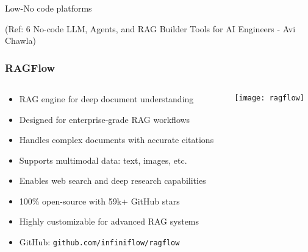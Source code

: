 \begin{frame}[fragile]\frametitle{}
\begin{center}
{\Large Low-No code platforms}

{\tiny (Ref: 6 No-code LLM, Agents, and RAG Builder Tools for AI Engineers - Avi Chawla)}
\end{center}
\end{frame}

\begin{frame}[fragile]\frametitle{RAGFlow}
\begin{columns}
    \begin{column}[T]{0.6\linewidth}
      \begin{itemize}
        \item RAG engine for deep document understanding
        \item Designed for enterprise-grade RAG workflows
        \item Handles complex documents with accurate citations
        \item Supports multimodal data: text, images, etc.
        \item Enables web search and deep research capabilities
        \item 100\% open-source with 59k+ GitHub stars
        \item Highly customizable for advanced RAG systems
        \item GitHub: \texttt{github.com/infiniflow/ragflow}
      \end{itemize}
    \end{column}
    \begin{column}[T]{0.4\linewidth}
        \begin{center}
        \texttt{[image: ragflow]}
        \end{center}	
    \end{column}
\end{columns}
\end{frame}

